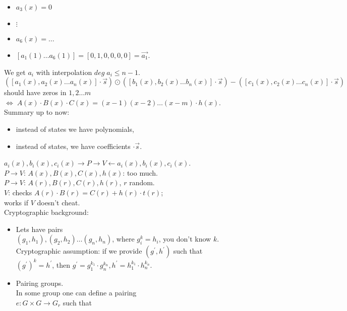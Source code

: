 \documentclass[a4paper, 12pt]{book}
\theoremstyle{definition}
\theoremstyle{remark}
\begin{document}
\begin{itemize}
\begin{itemize}[label={}]
      \item $a_3(x) = 0$
      \item $\vdots$
      \item $a_6(x) = \dots$
      \item $[a_1(1) \dots a_6(1)] = [0, 1, 0, 0, 0, 0] = \overrightarrow{a_1}$.
    \end{itemize}
    We get $a_i$ with interpolation $deg \; a_i \leq n-1$.
    \begin{equation*}
      \left([a_1(x), a_2(x) \dots a_n(x)] \cdot \overrightarrow{s}\right) \odot
      \left([b_1(x), b_2(x) \dots b_n(x)] \cdot \overrightarrow{s}\right) -
      \left([c_1(x), c_2(x) \dots c_n(x)] \cdot \overrightarrow{s}\right)
    \end{equation*}
    should have zeros in $1, 2 \dots m$ \\
    $\iff \; A(x) \cdot B(x) \cdot C(x) = (x-1) (x-2) \dots (x-m) \cdot h(x)$. \\
    Summary up to now:
    \begin{itemize}
      \item instead of states we have polynomials,
      \item instead of states, we have coefficients $\cdot \overrightarrow{s}$.
    \end{itemize}
    $a_i(x), b_i(x), c_i(x) \to P \to V \leftarrow a_i(x), b_i(x), c_i(x)$. \\
    $P \to V$: $A(x), B(x), C(x), h(x)$: too much. \\
    $P \to V$: $A(r), B(r), C(r), h(r)$, $r$ random. \\
    $V$: checks $A(r) \cdot B(r) = C(r) + h(r) \cdot t(r)$; \\
    works if $V$ doesn't cheat. \\
    Cryptographic background:
    \begin{itemize}
      \item Lets have pairs \\
        $(g_1, h_1), (g_2, h_2) \dots (g_n, h_n)$, where $g_i^k = h_i$, you don't know $k$. \\
        Cryptographic assumption: if we provide $(g^{'}, h^{'})$ such that \\
        $(g^{'})^{k} = h^{'}$, then $g^{'} = g_1^{k_1} \cdot g_n^{k_n}, h^{'} = h_1^{k_1} \cdot h_n^{k_n}$.
      \item Pairing groups. \\
        In some group one can define a pairing \\
        $e: G \times G \to G_r$ such that \\

\end{itemize}
\end{itemize}
\end{document}
